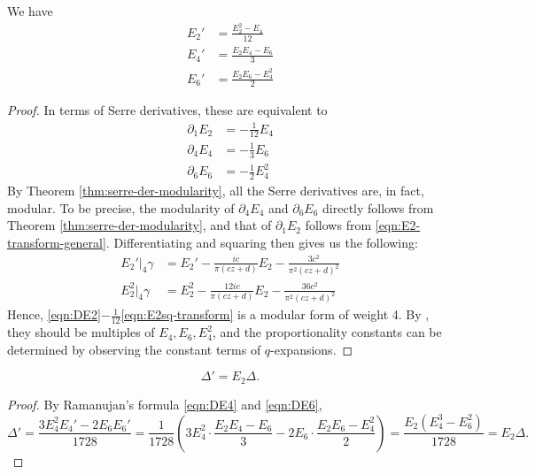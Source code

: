 \begin{theorem}\label{thm:ramanujan-formula} 
We have
\begin{align}
    E_2' &= \frac{E_2^2 - E_4}{12} \label{eqn:DE2} \\
    E_4' &= \frac{E_2 E_4 - E_6}{3} \label{eqn:DE4} \\
    E_6' &= \frac{E_2 E_6 - E_4^2}{2} \label{eqn:DE6}
\end{align}
\end{theorem}
\begin{proof}
In terms of Serre derivatives, these are equivalent to
\begin{align}
    \partial_{1}E_2 &= -\frac{1}{12} E_4 \label{eqn:SE2} \\
    \partial_{4}E_4 &= -\frac{1}{3} E_6 \label{eqn:SE4} \\
    \partial_{6}E_6 &= -\frac{1}{2} E_4^2 \label{eqn:SE6}
\end{align}
By Theorem \ref{thm:serre-der-modularity}, all the Serre derivatives are, in fact, modular.
To be precise, the modularity of $\partial_{4} E_4$ and $\partial_6 E_6$ directly follows from Theorem \ref{thm:serre-der-modularity}, and that of $\partial_{1}E_2$ follows from \eqref{eqn:E2-transform-general}.
Differentiating and squaring then gives us the following:
\begin{align}
    E_2'|_{4}\gamma &= E_2' - \frac{ic}{\pi(cz + d)} E_2 - \frac{3c^2}{\pi^2 (cz + d)^2} \label{eqn:DE2-transform} \\
    E_2^2|_{4}\gamma &= E_2^2 - \frac{12ic}{\pi(cz + d)} E_2 - \frac{36c^2}{\pi^2 (cz + d)^2} \label{eqn:E2sq-transform}
\end{align}
Hence, \eqref{eqn:DE2}$-\frac{1}{12}$\eqref{eqn:E2sq-transform} is a modular form of weight 4.
By , they should be multiples of $E_4, E_6, E_4^2$, and the proportionality constants can be determined by observing the constant terms of $q$-expansions.
\end{proof}
\begin{corollary}\label{cor:logder-disc-E2}
\begin{equation}\label{eqn:logder-disc-E2}
    \Delta' = E_2 \Delta.
\end{equation}
\end{corollary}
\begin{proof}
By Ramanujan's formula \eqref{eqn:DE4} and \eqref{eqn:DE6},
\begin{equation}
\Delta' = \frac{3 E_4^2 E_4' - 2 E_6 E_6'}{1728} = \frac{1}{1728} \left(3 E_4^2 \cdot \frac{E_2 E_4 - E_6}{3} - 2 E_6 \cdot \frac{E_2 E_6 - E_4^2}{2}\right) = \frac{E_2(E_4^3 - E_6^2)}{1728} = E_2\Delta.
\end{equation}
\end{proof}

